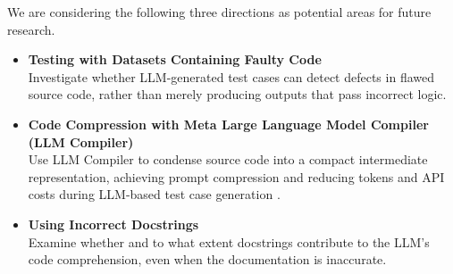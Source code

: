 We are considering the following three directions as potential areas for future research.

\begin{itemize}[label={$\bullet$}]
    \item \textbf{Testing with Datasets Containing Faulty Code} \\Investigate whether LLM-generated test cases can detect defects in flawed source code, rather than merely producing outputs that pass incorrect logic.
    \vspace{0.3cm}
    
    \item \textbf{Code Compression with Meta Large Language Model Compiler (LLM Compiler)} \\Use LLM Compiler to condense source code into a compact intermediate representation, achieving prompt compression and reducing tokens and API costs during LLM-based test case generation \cite{cummins2024metalargelanguagemodel}.
    \vspace{0.3cm}

    \item \textbf{Using Incorrect Docstrings} \\Examine whether and to what extent docstrings contribute to the LLM’s code comprehension, even when the documentation is inaccurate.
\end{itemize}
